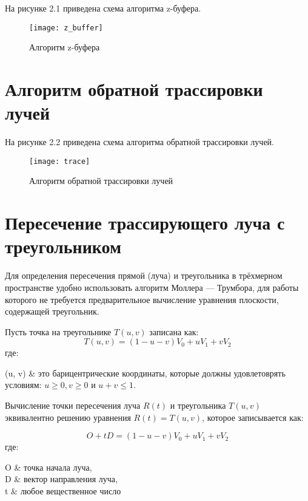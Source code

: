 \documentclass[12pt,a4paper,oneside]{report}
\makeatletter
\newenvironment{conditions*}
{\par\vspace{\abovedisplayskip}\noindent
	\tabularx{\columnwidth}{>{$}l<{$} @{${}-{}$} >{\raggedright\arraybackslash}X}}
{\endtabularx\par\vspace{\belowdisplayskip}}
\makeatother
\begin{document}
	\quad На рисунке 2.1 приведена схема алгоритма z-буфера. 
	
	\begin{figure}[H]
		\centering
		\texttt{[image: z\_buffer]}
		\caption{Алгоритм z-буфера}
		\label{fig:z}
	\end{figure}

	\section{Алгоритм обратной трассировки лучей}
	
	\quad На рисунке 2.2 приведена схема алгоритма обратной трассировки лучей. 
	
	\begin{figure}[H]
		\centering
		\texttt{[image: trace]}
		\caption{Алгоритм обратной трассировки лучей}
		\label{fig:z}
	\end{figure}

	\section{Пересечение трассирующего луча с треугольником}
	 \quad Для определения пересечения прямой (луча) и треугольника в трёхмерном пространстве удобно использовать алгоритм Моллера — Трумбора, для работы которого не требуется предварительное вычисление уравнения плоскости, содержащей треугольник.
	
	 Пусть точка на треугольнике $T(u, v)$ записана как:
	\begin{equation}
	T(u,v) = (1 - u - v) V_0 + u  V_1 + v  V_2
	\end{equation}
	где:
	\begin{conditions*}
		(u, v)     &  это барицентрические координаты, которые должны удовлетоврять условиям: $u \geqslant 0, v \geqslant 0$ и $ u + v \leqslant 1$. \\
	\end{conditions*}
	
	 Вычисление точки пересечения луча $R(t)$ и треугольника $T(u, v)$ эквивалентно решению уравнения $R(t) = T(u, v)$, которое записывается как:
	
	\begin{equation}
	O + tD = (1 - u - v) V_0 + u V_1 + v V_2
	\end{equation}
	где:
	\begin{conditions*}
		O & точка начала луча,\\
		D  & вектор направления луча,\\
		t  & любое вещественное число
	\end{conditions*}
	
\end{document}
